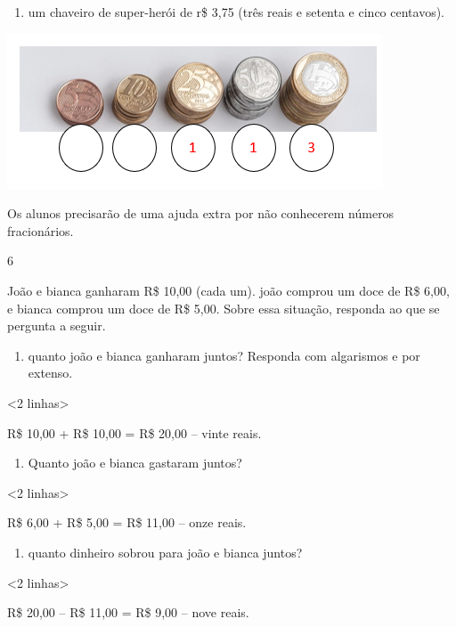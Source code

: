 \begin{enumerate}
\def\labelenumi{\Alph{enumi})}
\item
  um chaveiro de super-herói de r\$ 3,75 (três reais e setenta e cinco
  centavos).
\end{enumerate}

\includegraphics[width=4.39645in,height=1.81275in]{media/image74.png}

Os alunos precisarão de uma ajuda extra por não conhecerem números fracionários.

\num{6}

João e bianca ganharam R\$ 10,00 (cada um). joão comprou um doce de R\$ 6,00,
e bianca comprou um doce de R\$ 5,00. Sobre essa situação, responda ao que se pergunta a seguir.

\begin{enumerate}
\def\labelenumi{\Alph{enumi})}
\item
  quanto joão e bianca ganharam juntos? Responda com algarismos e por extenso.
\end{enumerate}

\textless{}2 linhas\textgreater{}

R\$ 10,00 + R\$ 10,00 = R\$ 20,00 -- vinte reais.

\begin{enumerate}
\def\labelenumi{\Alph{enumi})}
\item
  Quanto joão e bianca gastaram juntos?
\end{enumerate}

\textless{}2 linhas\textgreater{}

R\$ 6,00 + R\$ 5,00 = R\$ 11,00 -- onze reais.

\begin{enumerate}
\def\labelenumi{\Alph{enumi})}
\item
  quanto dinheiro sobrou para joão e bianca juntos?
\end{enumerate}

\textless{}2 linhas\textgreater{}

R\$ 20,00 -- R\$ 11,00 = R\$ 9,00 -- nove reais.

